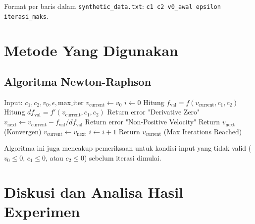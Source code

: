 \documentclass[conference]{IEEEtran}
\begin{document}
Format per baris dalam \texttt{synthetic\_data.txt}: \texttt{c1 c2 v0\_awal epsilon iterasi\_maks}.

\section{Metode Yang Digunakan}
\subsection{Algoritma Newton-Raphson}
\begin{algorithmic}[1]
\STATE Input: $c_1, c_2, v_0, \epsilon, \text{max\_iter}$
\STATE $v_{\text{current}} \gets v_0$
\STATE $i \gets 0$
    \STATE Hitung $f_{\text{val}} = f(v_{\text{current}}, c_1, c_2)$
    \STATE Hitung $df_{\text{val}} = f'(v_{\text{current}}, c_1, c_2)$
        \STATE Return error "Derivative Zero"
    \ENDIF
    \STATE $v_{\text{next}} \gets v_{\text{current}} - f_{\text{val}} / df_{\text{val}}$
        \STATE Return error "Non-Positive Velocity"
    \ENDIF
        \STATE Return $v_{\text{next}}$ (Konvergen)
    \ENDIF
    \STATE $v_{\text{current}} \gets v_{\text{next}}$
    \STATE $i \gets i + 1$
\ENDWHILE
\STATE Return $v_{\text{current}}$ (Max Iterations Reached)
\end{algorithmic}
Algoritma ini juga mencakup pemeriksaan untuk kondisi input yang tidak valid ($v_0 \le 0$, $c_1 \le 0$, atau $c_2 \le 0$) sebelum iterasi dimulai.

\section{Diskusi dan Analisa Hasil Experimen}
\end{document}

